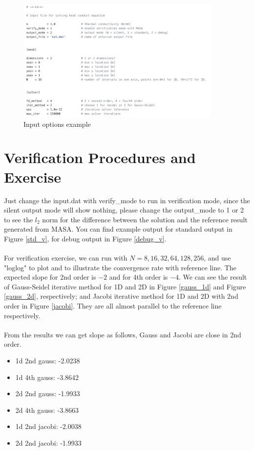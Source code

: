\documentclass[a4paper]{article}
\begin{document}
\begin{figure}
\centering
\includegraphics[width=0.9\textwidth]{input.png}
\caption{\label{input}Input options example}
\end{figure}

\section{Verification Procedures and Exercise}
Just change the input.dat with verify\_mode to run in verification mode, since the silent output mode will show nothing, please change the output\_mode to 1 or 2 to see the $l_2$ norm for the difference between the solution and the reference result generated from MASA. You can find example output for standard output in Figure \ref{std_v}, for debug output in Figure \ref{debug_v}.\\\\
For verification exercise, we can run with $N= 8, 16, 32, 64, 128, 256$, and use "loglog" to plot and to illustrate the convergence rate with reference line. The expected slope for 2nd order is $-2$ and for 4th order is $-4$. We can see the result of Gauss-Seidel iterative method for 1D and 2D in Figure \ref{gauss_1d} and Figure \ref{gauss_2d}, respectively; and Jacobi iterative method for 1D and 2D with 2nd order in Figure \ref{jacobi}. They are all almost parallel to the reference line respectively.\\\\
From the results we can get slope as follows, Gauss and Jacobi are close in 2nd order.\\
\begin{itemize}
    \item 1d 2nd gauss:  -2.0238
    \item 1d 4th gauss:  -3.8642
    \item 2d 2nd gauss:  -1.9933
    \item 2d 4th gauss:  -3.8663
    \item 1d 2nd jacobi: -2.0038
    \item 2d 2nd jacobi: -1.9933
\end{itemize}
\end{document}
